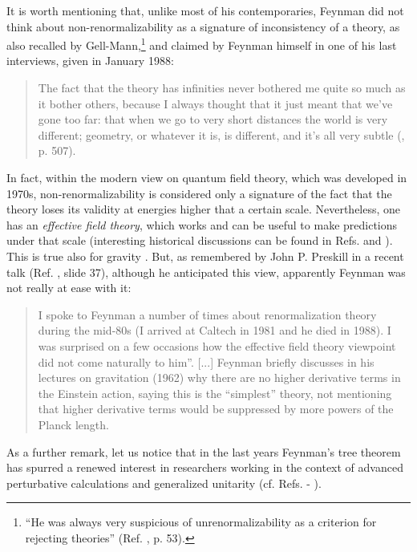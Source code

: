 \documentclass{ws-procs961x669}            %
\begin{document}
It is worth mentioning that, unlike most of his contemporaries,
Feynman did not think about non-renormalizability as a signature
of inconsistency of a theory, as also recalled by
Gell-Mann,\footnote{``He was always very suspicious of
unrenormalizability as a criterion for rejecting theories'' (Ref.
, p. 53).} and claimed by Feynman himself in
one of his last interviews, given in January 1988:
%
\begin{quote}
The fact that the theory has infinities never bothered me quite so
much as it bother others, because I always thought that it just
meant that we've gone too far: that when we go to very short
distances the world is very different; geometry, or whatever it
is, is different, and it's all very subtle (\cite{Mehra:1994dz}, p. 507).
\end{quote}
%
In fact, within the modern view on quantum field theory, which was
developed in 1970s, non-renormalizability is considered only a
signature of the fact that the theory loses its validity at
energies higher that a certain scale. Nevertheless, one has an
\emph{effective field theory}, which works and can be useful to
make predictions under that scale (interesting historical
discussions can be found in Refs.  and
). This is true also for gravity
\cite{Burgess:2003jk}. But, as remembered by John P. Preskill in a
recent talk (Ref. , slide 37), although he
anticipated this view, apparently Feynman was not really at ease
with it:
%
\begin{quote}
I spoke to Feynman a number of times about renormalization theory
during the mid-80s (I arrived at Caltech in 1981 and he died in
1988). I was surprised on a few occasions how the effective field
theory viewpoint did not come naturally to him''. [...] Feynman
briefly discusses in his lectures on gravitation (1962) why there
are no higher derivative terms in the Einstein action, saying this
is the ``simplest'' theory, not mentioning that higher derivative
terms would be suppressed by more powers of the Planck length.
\end{quote}
%
As a further remark, let us notice that in the last years
Feynman's tree theorem has spurred a renewed interest in
researchers working in the context of advanced perturbative
calculations and generalized unitarity (cf. Refs.
 - ).
\end{document}
